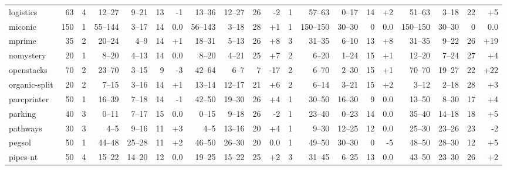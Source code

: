 \documentclass{article}
\begin{document}
\begin{table}
\begin{tabular}{l@{}rr|rrrr|rrrr|r|rrrr|rrrr}
    logistics &    63 &   4 &  12--27 &  9--21 &  13 &  {\color{red}-1} &  13--36 & 12--27 &  26 &   {\color{red}-2} &   1 &   57--63 &  0--17 &  14 &  {\color{blue}+2} &   51--63 &  3--18 &  22 &  {\color{blue}+5} \\
      miconic &   150 &   1 & 55--144 &  3--17 &  14 &              0.0 & 56--143 &  3--18 &  28 &  {\color{blue}+1} &   1 & 150--150 & 30--30 &   0 &               0.0 & 150--150 & 30--30 &   0 &               0.0 \\
       mprime &    35 &   2 &  20--24 &   4--9 &  14 & {\color{blue}+1} &  18--31 &  5--13 &  26 &  {\color{blue}+8} &   3 &   31--35 &  6--10 &  13 &  {\color{blue}+8} &   31--35 &  9--22 &  26 & {\color{blue}+19} \\
    nomystery &    20 &   1 &   8--20 &  4--13 &  14 &              0.0 &   8--20 &  4--21 &  25 &  {\color{blue}+7} &   2 &    6--20 &  1--24 &  15 &  {\color{blue}+1} &   12--20 &  7--24 &  27 &  {\color{blue}+4} \\
   openstacks &    70 &   2 &  23--70 &  3--15 &   9 &  {\color{red}-3} &  42--64 &   6--7 &   7 &  {\color{red}-17} &   2 &    6--70 &  2--30 &  15 &  {\color{blue}+1} &   70--70 & 19--27 &  22 & {\color{blue}+22} \\
organic-split &    20 &   2 &   7--15 &  3--16 &  14 & {\color{blue}+1} &  13--14 & 12--17 &  21 &  {\color{blue}+6} &   2 &    6--14 &  3--21 &  15 &  {\color{blue}+2} &    3--12 &  2--18 &  28 &  {\color{blue}+3} \\
  parcprinter &    50 &   1 &  16--39 &  7--18 &  14 &  {\color{red}-1} &  42--50 & 19--30 &  26 &  {\color{blue}+4} &   1 &   30--50 & 16--30 &   9 &               0.0 &   13--50 &  8--30 &  17 &  {\color{blue}+4} \\
      parking &    40 &   3 &   0--11 &  7--17 &  15 &              0.0 &   0--15 &  9--18 &  26 &   {\color{red}-2} &   1 &   23--40 &  0--23 &  14 &               0.0 &   35--40 & 14--18 &  18 &  {\color{blue}+5} \\
     pathways &    30 &   3 &    4--5 &  9--16 &  11 & {\color{blue}+3} &    4--5 & 13--16 &  20 &  {\color{blue}+4} &   1 &    9--30 & 12--25 &  12 &               0.0 &   25--30 & 23--26 &  23 &   {\color{red}-2} \\
       pegsol &    50 &   1 &  44--48 & 25--28 &  11 & {\color{blue}+2} &  46--50 & 26--30 &  20 &               0.0 &   1 &   49--50 & 30--30 &   0 &   {\color{red}-5} &   48--50 & 28--30 &  12 &  {\color{blue}+5} \\
     pipes-nt &    50 &   4 &  15--22 & 14--20 &  12 &              0.0 &  19--25 & 15--22 &  25 &  {\color{blue}+2} &   3 &   31--45 &  6--25 &  13 &               0.0 &   43--50 & 23--30 &  26 &  {\color{blue}+2} \\

\end{tabular}
\end{table}
\end{document}

